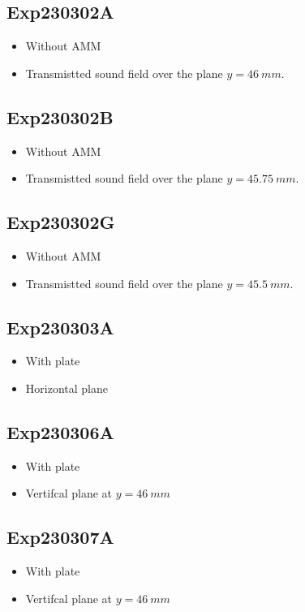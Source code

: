 \documentclass{article}
\begin{document}
\subsection{Exp230302A}
\label{sec:Exp230302A}
\begin{itemize}
    \item Without AMM
    \item Transmistted sound field over the plane $y=\SI{46}{mm}$.
\end{itemize}

\subsection{Exp230302B}
\label{sec:Exp230302B}
\begin{itemize}
    \item Without AMM
    \item Transmistted sound field over the plane $y=\SI{45.75}{mm}$.
\end{itemize}

\subsection{Exp230302G}
\label{sec:Exp230302G}
\begin{itemize}
    \item Without AMM
    \item Transmistted sound field over the plane $y=\SI{45.5}{mm}$.
\end{itemize}

\subsection{Exp230303A}
\label{sec:Exp230303A}
\begin{itemize}
    \item With plate
    \item Horizontal plane
\end{itemize}

\subsection{Exp230306A}
\label{sec:Exp230306A}
\begin{itemize}
    \item With plate
    \item Vertifcal plane at $y=\SI{46}{mm}$
\end{itemize}

\subsection{Exp230307A}
\label{sec:Exp230307A}
\begin{itemize}
    \item With plate
    \item Vertifcal plane at $y=\SI{46}{mm}$
\end{itemize}
\end{document}

